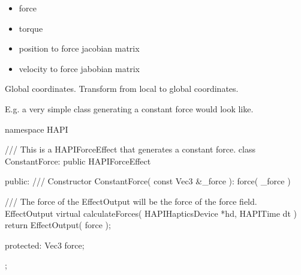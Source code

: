 \begin{itemize}
\item force
\item torque
\item position to force jacobian matrix
\item velocity to force jabobian matrix
\end{itemize}

Global coordinates. Transform from local to global coordinates.

E.g. a very simple class generating a constant force would look like.

namespace HAPI {
  /// This is a HAPIForceEffect that generates a constant force.
  class ConstantForce: public HAPIForceEffect {
  public:
    /// Constructor
    ConstantForce( const Vec3 \&\_force ): 
      force( \_force ) {}

    /// The force of the EffectOutput will be the force of the force field. 
    EffectOutput virtual calculateForces( HAPIHapticsDevice *hd,
                                          HAPITime dt ) {
      return EffectOutput( force );
    }
    
  protected:
    Vec3 force;
  };
}



